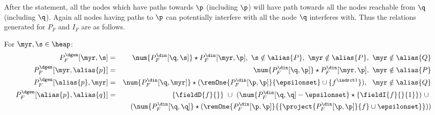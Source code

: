 \begin{enumerate}
After the statement, all the nodes which have paths towards $\p$ (including $\p$) will have path towards 
all the nodes reachable from $\q$ (including $\q$). Again all nodes having paths to $\p$ can potentially interfere
with all the node $\q$ interferes with. Thus the relations generated for $P_F$ and $I_F$ are as follows. 

{\blue
For $\myr, \s \in \heap$:
\begin{eqnarray*}
P_F^{\dgen}[\myr, \s] &=& \num{P_F^{\din}[\q, \s]} \star  P_F^{\din}[\myr, \p],\ \s \notin \alias{P},\ \myr \notin \alias{P},\ \myr \notin \alias{Q} \\
P_F^{\dgen}[\myr, \alias{p}] &=& \num{P_F^{\din}[\q,\p]} \star P_F^{\din}[\myr, \p], \ \myr \notin \alias{P}\\
P_F^{\dgen}[\alias{p}, \myr] &=& \num{P_F^{\din}[\q, \myr]} \star (\remOne{P_F^{\din}[\p, \p]}{\epsilonset} \cup \{f^{\indrct 1}\}), \ \  \myr \notin \alias{Q} \\ 
P_F^{\dgen}[\alias{p}, \alias{q}] &=& \{\fieldD{f}{}\}\ \cup\ (\num{P_F^{\din}[\q, \q] - \epsilonset} \star \{\fieldI{f}{}{1}\})\ \cup\ \\
								 &&	(\num{P_F^{\din}[\q, \q]} \star ( \remOne{P_F^{\din}[\p, \p]}{\{\project{P_F^{\din}[\p,\p]}{f} \cup \epsilonset \}})) \\ 
\end{eqnarray*}

}
\end{enumerate}
